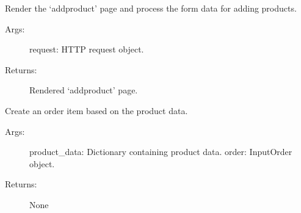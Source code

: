 \documentclass[letterpaper,10pt,english]{sphinxmanual}
\begin{document}

\begin{fulllineitems}
\label{\detokenize{modules/views:Inventory.views.AddProducts}}
\sphinxAtStartPar
Render the ‘add\sphinxhyphen{}product’ page and process the form data for adding products.
\begin{description}
\item[{Args:}] \leavevmode
\sphinxAtStartPar
request: HTTP request object.

\item[{Returns:}] \leavevmode
\sphinxAtStartPar
Rendered ‘add\sphinxhyphen{}product’ page.

\end{description}

\end{fulllineitems}


\begin{fulllineitems}
\label{\detokenize{modules/views:Inventory.views.CreateOrderItem}}
\sphinxAtStartPar
Create an order item based on the product data.
\begin{description}
\item[{Args:}] \leavevmode
\sphinxAtStartPar
product\_data: Dictionary containing product data.
order: InputOrder object.

\item[{Returns:}] \leavevmode
\sphinxAtStartPar
None

\end{description}

\end{fulllineitems}

\end{document}
